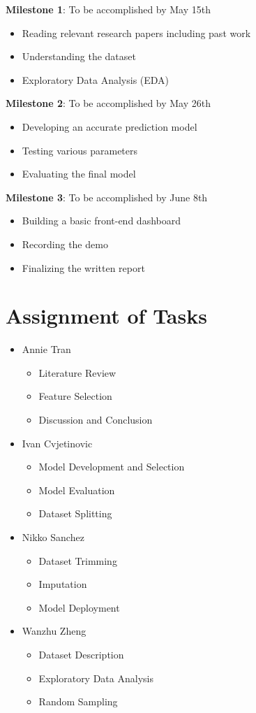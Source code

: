 \documentclass[journal]{IEEEtran}
\begin{document}
\textbf{Milestone 1}: To be accomplished by May 15th
\begin{itemize}
    \item Reading relevant research papers including past work
    \item Understanding the dataset
    \item Exploratory Data Analysis (EDA)
\end{itemize}

\textbf{Milestone 2}: To be accomplished by May 26th
\begin{itemize}
    \item Developing an accurate prediction model
    \item Testing various parameters
    \item Evaluating the final model
\end{itemize}

\textbf{Milestone 3}: To be accomplished by June 8th
\begin{itemize}
    \item Building a basic front-end dashboard
    \item Recording the demo
    \item Finalizing the written report
\end{itemize}

\section{Assignment of Tasks}
\begin{itemize}
    \item Annie Tran
    \begin{itemize}
        \item Literature Review
        \item Feature Selection
        \item Discussion and Conclusion
    \end{itemize}
    \item Ivan Cvjetinovic
    \begin{itemize}
        \item Model Development and Selection
        \item Model Evaluation
        \item Dataset Splitting
    \end{itemize}
    \item Nikko Sanchez
    \begin{itemize}
        \item Dataset Trimming
        \item Imputation
        \item Model Deployment
    \end{itemize}
    \item Wanzhu Zheng
    \begin{itemize}
        \item Dataset Description
        \item Exploratory Data Analysis
        \item Random Sampling
    \end{itemize}
\end{itemize}
\end{document}
